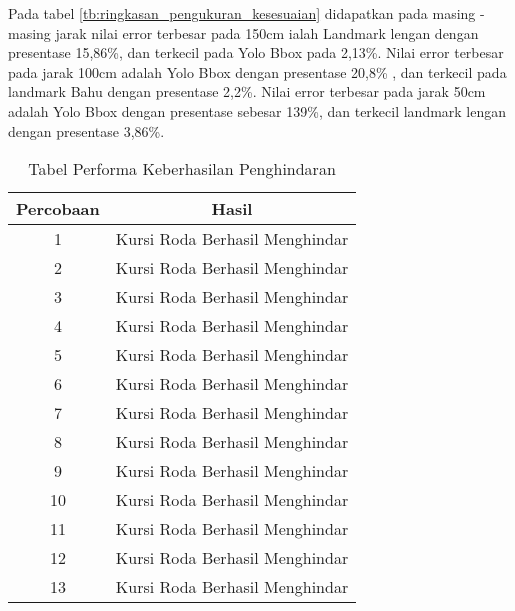 Pada tabel \ref{tb:ringkasan_pengukuran_kesesuaian} didapatkan pada masing - masing jarak nilai error terbesar pada 150cm ialah Landmark lengan dengan presentase 15,86\%, dan terkecil pada Yolo Bbox pada 2,13\%. Nilai error terbesar pada jarak 100cm adalah Yolo Bbox dengan presentase 20,8\% , dan terkecil pada landmark Bahu dengan presentase 2,2\%. Nilai error terbesar pada jarak 50cm adalah Yolo Bbox dengan presentase sebesar 139\%, dan terkecil landmark lengan dengan presentase 3,86\%.
\begin{table}[H]
    \centering
    \caption{Tabel Performa Keberhasilan Penghindaran}
    \label{tb:Agungganteng}
    \begin{tabular}{|c|c|}
    \hline
    Percobaan & Hasil                                                               \\ \hline
    1         & \cellcolor[HTML]{9AFF99}Kursi Roda Berhasil Menghindar              \\ \hline
    2         & \cellcolor[HTML]{9AFF99}Kursi Roda Berhasil Menghindar              \\ \hline
    3         & \cellcolor[HTML]{9AFF99}Kursi Roda Berhasil Menghindar              \\ \hline
    4         & \cellcolor[HTML]{9AFF99}Kursi Roda Berhasil Menghindar              \\ \hline
    5         & \cellcolor[HTML]{9AFF99}Kursi Roda Berhasil Menghindar              \\ \hline
    6         & \cellcolor[HTML]{9AFF99}Kursi Roda Berhasil Menghindar              \\ \hline
    7         & \cellcolor[HTML]{9AFF99}Kursi Roda Berhasil Menghindar              \\ \hline
    8         & \cellcolor[HTML]{9AFF99}Kursi Roda Berhasil Menghindar              \\ \hline
    9         & \cellcolor[HTML]{9AFF99}Kursi Roda Berhasil Menghindar              \\ \hline
    10        & \cellcolor[HTML]{9AFF99}Kursi Roda Berhasil Menghindar              \\ \hline
    11        & \cellcolor[HTML]{9AFF99}Kursi Roda Berhasil Menghindar              \\ \hline
    12        & \cellcolor[HTML]{9AFF99}Kursi Roda Berhasil Menghindar              \\ \hline
    13        & \cellcolor[HTML]{9AFF99}Kursi Roda Berhasil Menghindar              \\ \hline

\end{tabular}
\end{table}
